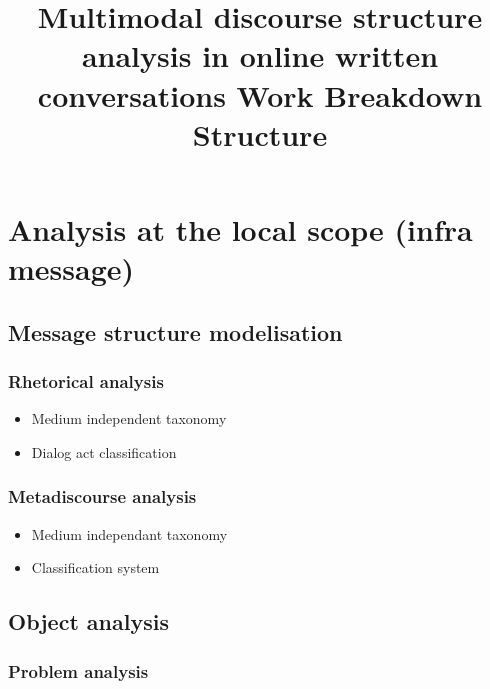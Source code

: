 \documentclass[11pt]{article}
\begin{document}
\title{Multimodal discourse structure analysis in online written conversations \linebreak \newline \textbf{Work Breakdown Structure}}

\begin{titlepage}

\maketitle

\tableofcontents

\end{titlepage}

\section{Analysis at the local scope (infra message)}

\subsection{Message structure modelisation}

\subsubsection{Rhetorical analysis}

\begin{itemize}
	\item Medium independent taxonomy
	\item Dialog act classification
\end{itemize}

\subsubsection{Metadiscourse analysis}

\begin{itemize}
	\item Medium independant taxonomy
	\item Classification system
\end{itemize}

\subsection{Object analysis}

\subsubsection{Problem analysis}
\end{document}
